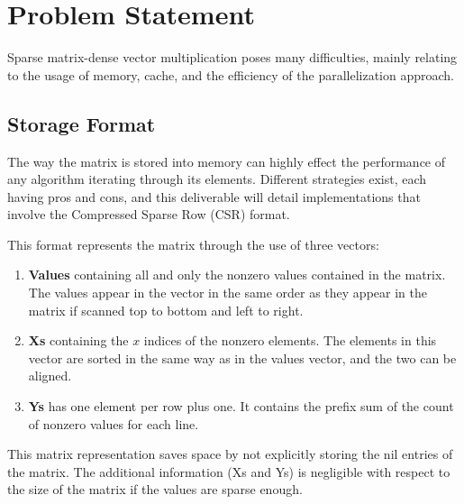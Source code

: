 \documentclass[conference]{IEEEtran}
\begin{document}
\section{Problem Statement}
% 
Sparse matrix-dense vector multiplication poses many difficulties, mainly relating to the usage of memory, cache, and the efficiency of the parallelization approach.

\subsection{Storage Format}
The way the matrix is stored into memory can highly effect the performance of any algorithm iterating through its elements. Different strategies exist, each having pros and cons, and this deliverable will detail implementations that involve the Compressed Sparse Row (CSR) format.

This format represents the matrix through the use of three vectors:
\begin{enumerate}
    \item \textbf{Values} containing all and only the nonzero values contained in the matrix. The values appear in the vector in the same order as they appear in the matrix if scanned top to bottom and left to right.
    \item \textbf{Xs} containing the $x$ indices of the nonzero elements. The elements in this vector are sorted in the same way as in the values vector, and the two can be aligned.
    \item \textbf{Ys} has one element per row plus one. It contains the prefix sum of the count of nonzero values for each line.
\end{enumerate}
This matrix representation saves space by not explicitly storing the nil entries of the matrix. The additional information (Xs and Ys) is negligible with respect to the size of the matrix if the values are sparse enough.
\end{document}
